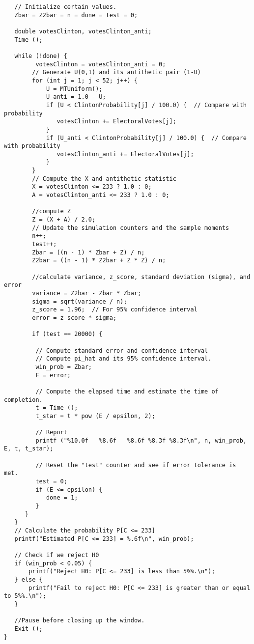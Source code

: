 \documentclass{report}
\begin{document}
\begin{lstlisting}
   // Initialize certain values.
   Zbar = Z2bar = n = done = test = 0;

   double votesClinton, votesClinton_anti;
   Time ();

   while (!done) {
         votesClinton = votesClinton_anti = 0;
        // Generate U(0,1) and its antithetic pair (1-U)
        for (int j = 1; j < 52; j++) {
            U = MTUniform();
            U_anti = 1.0 - U;
            if (U < ClintonProbability[j] / 100.0) {  // Compare with probability
               votesClinton += ElectoralVotes[j];
            }
            if (U_anti < ClintonProbability[j] / 100.0) {  // Compare with probability
               votesClinton_anti += ElectoralVotes[j];
            }
        }
        // Compute the X and antithetic statistic
        X = votesClinton <= 233 ? 1.0 : 0;
        A = votesClinton_anti <= 233 ? 1.0 : 0;

        //compute Z
        Z = (X + A) / 2.0;
        // Update the simulation counters and the sample moments
        n++;
        test++;
        Zbar = ((n - 1) * Zbar + Z) / n;
        Z2bar = ((n - 1) * Z2bar + Z * Z) / n;

        //calculate variance, z_score, standard deviation (sigma), and error
        variance = Z2bar - Zbar * Zbar;
        sigma = sqrt(variance / n);
        z_score = 1.96;  // For 95% confidence interval
        error = z_score * sigma;

        if (test == 20000) {

         // Compute standard error and confidence interval
         // Compute pi_hat and its 95% confidence interval.
         win_prob = Zbar;
         E = error;

         // Compute the elapsed time and estimate the time of completion.
         t = Time ();
         t_star = t * pow (E / epsilon, 2);

         // Report
         printf ("%10.0f   %8.6f   %8.6f %8.3f %8.3f\n", n, win_prob, E, t, t_star);

         // Reset the "test" counter and see if error tolerance is met.
         test = 0;
         if (E <= epsilon) {
            done = 1;
         }
      } 
   }
   // Calculate the probability P[C <= 233]
   printf("Estimated P[C <= 233] = %.6f\n", win_prob);

   // Check if we reject H0
   if (win_prob < 0.05) {
       printf("Reject H0: P[C <= 233] is less than 5%%.\n");
   } else {
       printf("Fail to reject H0: P[C <= 233] is greater than or equal to 5%%.\n");
   }

   //Pause before closing up the window.
   Exit ();
}
\end{lstlisting}
\pagebreak
\end{document}
